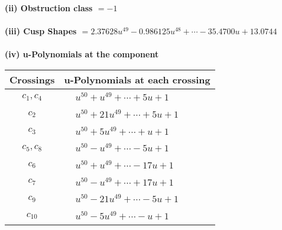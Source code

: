 \documentclass[1p]{elsarticle_modified}
\theoremstyle{definition}
\begin{document}
\flushleft \textbf{(ii) Obstruction class $= -1$}\\~\\
\flushleft \textbf{(iii) Cusp Shapes $= 2.37628 u^{49}-0.986125 u^{48}+\cdots-35.4700 u+13.0744$}\\~\\
\newpage\renewcommand{\arraystretch}{1}
\flushleft \textbf{(iv) u-Polynomials at the component}\newline \\
\begin{tabular}{m{50pt}|m{274pt}}
Crossings & \hspace{64pt}u-Polynomials at each crossing \\
\hline $$\begin{aligned}c_{1},c_{4}\end{aligned}$$&$\begin{aligned}
&u^{50}+u^{49}+\cdots+5 u+1
\end{aligned}$\\
\hline $$\begin{aligned}c_{2}\end{aligned}$$&$\begin{aligned}
&u^{50}+21 u^{49}+\cdots+5 u+1
\end{aligned}$\\
\hline $$\begin{aligned}c_{3}\end{aligned}$$&$\begin{aligned}
&u^{50}+5 u^{49}+\cdots+u+1
\end{aligned}$\\
\hline $$\begin{aligned}c_{5},c_{8}\end{aligned}$$&$\begin{aligned}
&u^{50}- u^{49}+\cdots-5 u+1
\end{aligned}$\\
\hline $$\begin{aligned}c_{6}\end{aligned}$$&$\begin{aligned}
&u^{50}+u^{49}+\cdots-17 u+1
\end{aligned}$\\
\hline $$\begin{aligned}c_{7}\end{aligned}$$&$\begin{aligned}
&u^{50}- u^{49}+\cdots+17 u+1
\end{aligned}$\\
\hline $$\begin{aligned}c_{9}\end{aligned}$$&$\begin{aligned}
&u^{50}-21 u^{49}+\cdots-5 u+1
\end{aligned}$\\
\hline $$\begin{aligned}c_{10}\end{aligned}$$&$\begin{aligned}
&u^{50}-5 u^{49}+\cdots- u+1
\end{aligned}$\\
\hline
\end{tabular}\\~\\
\end{document}
